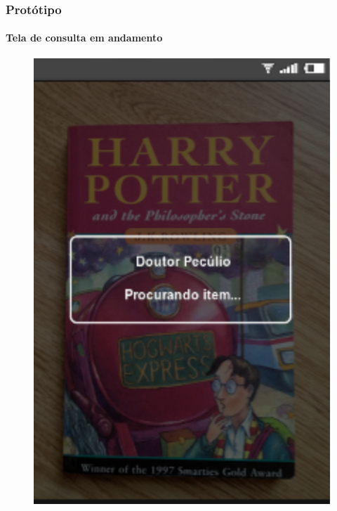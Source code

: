 \documentclass[14pt,beamer]{beamer}
\begin{document}
\begin{frame}
	\frametitle{Protótipo}
	\framesubtitle{Tela de consulta em andamento}

    \begin{figure}
        \centering
        \includegraphics[scale=.71]{tela/TelaBuscando}
    \end{figure}
\end{frame}
\end{document}
